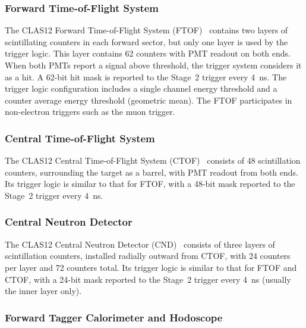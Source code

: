 \subsubsection{Forward Time-of-Flight System}

The CLAS12 Forward Time-of-Flight System (FTOF)~\cite{ftof-ref} contains two layers of scintillating
counters in each forward sector, but only one layer is used by the trigger logic. This layer contains 62 counters
with PMT readout on both ends. When both PMTs report a signal above threshold, the trigger system considers
it as a hit. A 62-bit hit mask is reported to the Stage~2 trigger every 4~ns. The trigger logic configuration
includes a single channel energy threshold and a counter average energy threshold (geometric mean). The FTOF
participates in non-electron triggers such as the muon trigger.

\subsubsection{Central Time-of-Flight System}

The CLAS12 Central Time-of-Flight System (CTOF)~\cite{ctof-ref} consists of 48 scintillation counters,
surrounding the target as a barrel, with PMT readout from both ends. Its trigger logic is similar to that for
FTOF, with a 48-bit mask reported to the Stage~2 trigger every 4~ns.


\subsubsection{Central Neutron Detector}

The CLAS12 Central Neutron Detector (CND)~\cite{cnd-ref} consists of three layers of scintillation counters,
installed radially outward from CTOF, with 24 counters per layer and 72 counters total. Its trigger logic is similar
to that for FTOF and CTOF, with a 24-bit mask reported to the Stage~2 trigger every 4~ns (usually the inner
layer only).

\subsubsection{Forward Tagger Calorimeter and Hodoscope}

